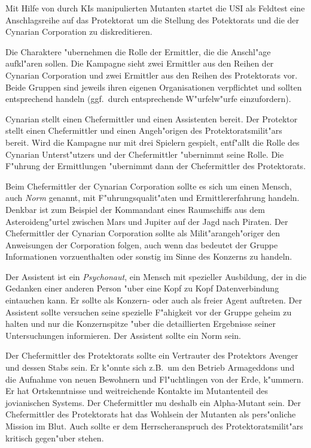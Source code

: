 Mit Hilfe von durch KIs manipulierten Mutanten startet die USI als Feldtest eine Anschlagsreihe auf das Protektorat um die Stellung des Potektorats und die der Cynarian Corporation zu diskreditieren.


Die Charaktere "ubernehmen die Rolle der Ermittler, die die Anschl"age aufkl"aren sollen. Die Kampagne sieht zwei Ermittler aus den Reihen der Cynarian Corporation und zwei Ermittler aus den Reihen des Protektorats vor. Beide Gruppen sind jeweils ihren eigenen Organisationen verpflichtet und sollten entsprechend handeln (ggf.~durch entsprechende W"urfelw"urfe einzufordern).

Cynarian stellt einen Chefermittler und einen Assistenten bereit. Der Protektor stellt einen Chefermittler und einen Angeh"origen des Protektoratsmilit"ars bereit. Wird die Kampagne nur mit drei Spielern gespielt, entf"allt die Rolle des Cynarian Unterst"utzers und der Chefermittler "ubernimmt seine Rolle. Die F"uhrung der Ermittlungen "ubernimmt dann der Chefermittler des Protektorats. 

Beim Chefermittler der Cynarian Corporation sollte es sich um einen Mensch, auch \emph{Norm} genannt, mit F"uhrungsqualit"aten und Ermittlererfahrung handeln. Denkbar ist zum Beispiel der Kommandant eines Raumschiffs aus dem Asteroideng"urtel zwischen Mars und Jupiter auf der Jagd nach Piraten. Der Chefermittler der Cynarian Corporation sollte als Milit"arangeh"origer den Anweisungen der Corporation folgen, auch wenn das bedeutet der Gruppe Informationen vorzuenthalten oder sonstig im Sinne des Konzerns zu handeln.

Der Assistent ist ein \emph{Psychonaut}, ein Mensch mit spezieller Ausbildung, der in die Gedanken einer anderen Person "uber eine Kopf zu Kopf Datenverbindung eintauchen kann. Er sollte als Konzern- oder auch als freier Agent auftreten. Der Assistent sollte versuchen seine spezielle F"ahigkeit vor der Gruppe geheim zu halten und nur die Konzernspitze "uber die detaillierten Ergebnisse seiner Untersuchungen informieren. Der Assistent sollte ein Norm sein.

Der Chefermittler des Protektorats sollte ein Vertrauter des Protektors Avenger und dessen Stabs sein. Er k"onnte sich z.B.~um den Betrieb Armageddons und die Aufnahme von neuen Bewohnern und Fl"uchtlingen von der Erde, k"ummern. Er hat Ortskenntnisse und weitreichende Kontakte im Mutantenteil des jovianischen Systems. Der Chefermittler mu\3 deshalb ein Alpha-Mutant sein. Der Chefermittler des Protektorats hat das Wohlsein der Mutanten als pers"onliche Mission im Blut. Auch sollte er dem Herrscheranspruch des Protektoratsmilit"ars kritisch gegen"uber stehen.

